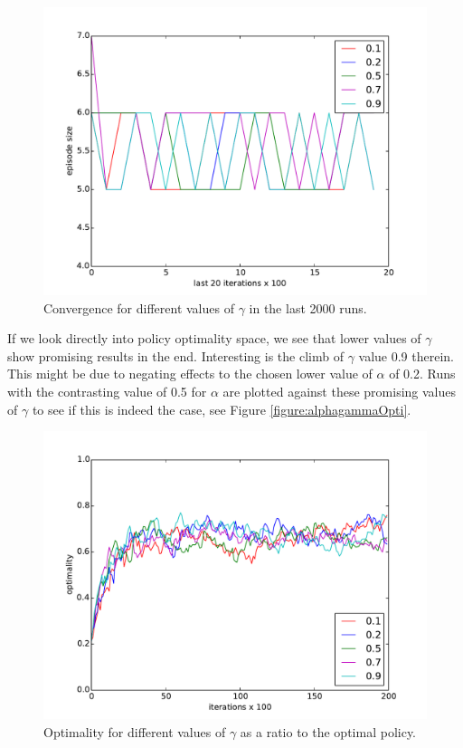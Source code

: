 \documentclass[paper=a4, fontsize=11pt]{scrartcl}
\numberwithin{equation}{section}		%
\numberwithin{figure}{section}			%
\numberwithin{table}{section}				%
\begin{document}
\begin{figure}[H] \centering
\includegraphics[scale=0.5]{gammalast20x100.pdf}
\caption{Convergence for different values of $\gamma$ in the last 2000 runs.} 
\label{figure:gammalast20}
\end{figure}
If we look directly into policy optimality space, we see that lower values of $\gamma$ show promising results in the end. Interesting is the climb of $\gamma$ value 0.9 therein. This might be due to negating effects to the chosen lower value of $\alpha$ of 0.2. Runs with the contrasting value of 0.5 for $\alpha$ are plotted against these promising values of $\gamma$ to see if this is indeed the case, see Figure \ref{figure:alphagammaOpti}.
\begin{figure}[H] \centering
\includegraphics[scale=0.5]{gammaOptimality.pdf}
\caption{Optimality for different values of $\gamma$ as a ratio to the optimal policy.} 
\label{figure:gammaOpti}
\end{figure}
\end{document}
